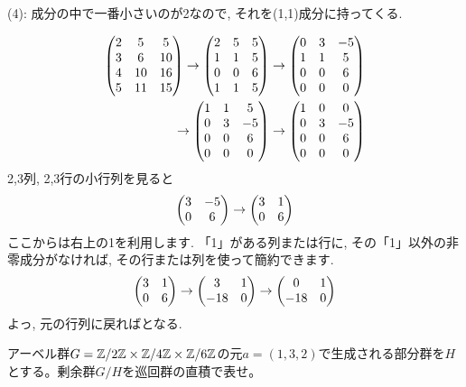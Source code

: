 \begin{egans}
(4): 成分の中で一番小さいのが2なので, それを(1,1)成分に持ってくる.

\begin{eqnarray*}
\begin{pmatrix} 2&5&5\\3&6&10\\4&10&16\\5&11&15 \end{pmatrix} \to \begin{pmatrix} 2&5&5\\1&1&5\\ 0&0&6\\1&1&5 \end{pmatrix} \to \begin{pmatrix} 0&3&-5\\ 1&1&5\\ 0&0&6\\ 0&0&0 \end{pmatrix}\\
\to \begin{pmatrix}1&1&5\\0&3&-5\\ 0&0&6\\ 0&0&0 \end{pmatrix} \to \begin{pmatrix} 1&0&0\\0&3&-5\\0&0&6\\0&0&0 \end{pmatrix}
\end{eqnarray*}
2,3列, 2,3行の小行列を見ると
\begin{eqnarray*}
\begin{pmatrix} 3&-5\\0&6 \end{pmatrix} \to \begin{pmatrix} 3&1\\0&6 \end{pmatrix}
\end{eqnarray*}
ここからは右上の1を利用します. 「1」がある列または行に, その「1」以外の非零成分がなければ, その行または列を使って簡約できます.
\[\begin{pmatrix} 3&1\\0&6 \end{pmatrix} \to \begin{pmatrix} 3&1\\-18&0 \end{pmatrix} \to \begin{pmatrix} 0 & 1\\ -18&0 \end{pmatrix}\]
よっ, 元の行列に戻ればとなる.
\end{egans}


\begin{egprob}
アーベル群$G=\mathbb{Z}/2\mathbb{Z}\times \mathbb{Z}/4\mathbb{Z}\times \mathbb{Z}/6\mathbb{Z}$の元$a=(1,3,2)$で生成される部分群を$H$とする。剰余群$G/H$を巡回群の直積で表せ。
\end{egprob}

\begin{egprob}

\end{egprob}























